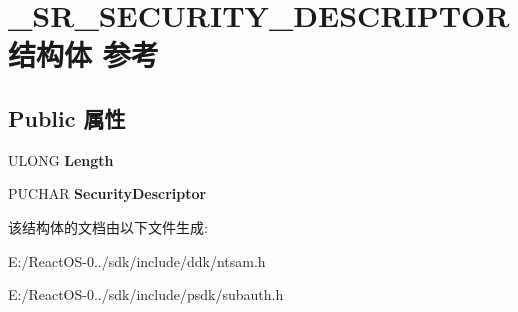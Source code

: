 \hypertarget{struct___s_r___s_e_c_u_r_i_t_y___d_e_s_c_r_i_p_t_o_r}{}\section{\+\_\+\+S\+R\+\_\+\+S\+E\+C\+U\+R\+I\+T\+Y\+\_\+\+D\+E\+S\+C\+R\+I\+P\+T\+O\+R结构体 参考}
\label{struct___s_r___s_e_c_u_r_i_t_y___d_e_s_c_r_i_p_t_o_r}
\subsection*{Public 属性}
\begin{DoxyCompactItemize}
\item 
\mbox{\label{struct___s_r___s_e_c_u_r_i_t_y___d_e_s_c_r_i_p_t_o_r_a494629ee8bd729bb45150b7ae0625caf}} 
U\+L\+O\+NG {\bfseries Length}
\item 
\mbox{\label{struct___s_r___s_e_c_u_r_i_t_y___d_e_s_c_r_i_p_t_o_r_a4129c96fc6f84f2696c71f3f618dfa25}} 
P\+U\+C\+H\+AR {\bfseries Security\+Descriptor}
\end{DoxyCompactItemize}


该结构体的文档由以下文件生成\+:\begin{DoxyCompactItemize}
\item 
E\+:/\+React\+O\+S-\/0../sdk/include/ddk/ntsam.\+h\item 
E\+:/\+React\+O\+S-\/0../sdk/include/psdk/subauth.\+h\end{DoxyCompactItemize}

